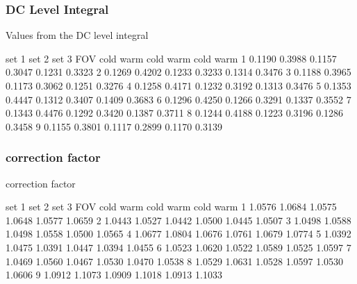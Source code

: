 \documentclass[11pt]{beamer}
\begin{document}
\begin{frame}[fragile]
\frametitle{DC Level Integral}

Values from the DC level integral\\
\begin{semiverbatim}\small
          set 1             set 2             set 3
FOV   cold     warm     cold     warm     cold     warm
 1   0.1190   0.3988   0.1157   0.3047   0.1231   0.3323
 2   0.1269   0.4202   0.1233   0.3233   0.1314   0.3476
 3   0.1188   0.3965   0.1173   0.3062   0.1251   0.3276
 4   0.1258   0.4171   0.1232   0.3192   0.1313   0.3476
 5   0.1353   0.4447   0.1312   0.3407   0.1409   0.3683
 6   0.1296   0.4250   0.1266   0.3291   0.1337   0.3552
 7   0.1343   0.4476   0.1292   0.3420   0.1387   0.3711
 8   0.1244   0.4188   0.1223   0.3196   0.1286   0.3458
 9   0.1155   0.3801   0.1117   0.2899   0.1170   0.3139
\end{semiverbatim}

\end{frame}
\begin{frame}[fragile]
\frametitle{correction factor}

correction factor\\
\begin{semiverbatim}\small
          set 1             set 2             set 3
FOV   cold     warm     cold     warm     cold     warm
 1   1.0576   1.0684   1.0575   1.0648   1.0577   1.0659
 2   1.0443   1.0527   1.0442   1.0500   1.0445   1.0507
 3   1.0498   1.0588   1.0498   1.0558   1.0500   1.0565
 4   1.0677   1.0804   1.0676   1.0761   1.0679   1.0774
 5   1.0392   1.0475   1.0391   1.0447   1.0394   1.0455
 6   1.0523   1.0620   1.0522   1.0589   1.0525   1.0597
 7   1.0469   1.0560   1.0467   1.0530   1.0470   1.0538
 8   1.0529   1.0631   1.0528   1.0597   1.0530   1.0606
 9   1.0912   1.1073   1.0909   1.1018   1.0913   1.1033
\end{semiverbatim}

\end{frame}
\end{document}
